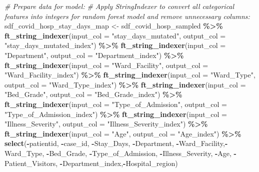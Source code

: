 \documentclass[
]{article}
\newenvironment{Shaded}{\begin{snugshade}}{\end{snugshade}}
\newcommand{\AttributeTok}[1]{\textcolor[rgb]{0.13,0.29,0.53}{#1}}
\newcommand{\CommentTok}[1]{\textcolor[rgb]{0.56,0.35,0.01}{\textit{#1}}}
\newcommand{\FunctionTok}[1]{\textcolor[rgb]{0.13,0.29,0.53}{\textbf{#1}}}
\newcommand{\NormalTok}[1]{#1}
\newcommand{\OtherTok}[1]{\textcolor[rgb]{0.56,0.35,0.01}{#1}}
\newcommand{\SpecialCharTok}[1]{\textcolor[rgb]{0.81,0.36,0.00}{\textbf{#1}}}
\newcommand{\StringTok}[1]{\textcolor[rgb]{0.31,0.60,0.02}{#1}}
\begin{document}
\begin{Shaded}
\begin{Highlighting}[]
\CommentTok{\# Prepare data for model: }
\CommentTok{\# Apply StringIndexer to convert all categorical features into integers for random forest model and remove unnecessary columns:}
\NormalTok{sdf\_covid\_hosp\_stay\_days\_map }\OtherTok{\textless{}{-}}\NormalTok{ sdf\_covid\_hosp\_sampled }\SpecialCharTok{\%\textgreater{}\%}
  \FunctionTok{ft\_string\_indexer}\NormalTok{(}\AttributeTok{input\_col =} \StringTok{"stay\_days\_mutated"}\NormalTok{, }\AttributeTok{output\_col =} \StringTok{"stay\_days\_mutated\_index"}\NormalTok{) }\SpecialCharTok{\%\textgreater{}\%}
  \FunctionTok{ft\_string\_indexer}\NormalTok{(}\AttributeTok{input\_col =} \StringTok{"Department"}\NormalTok{, }\AttributeTok{output\_col =} \StringTok{"Department\_index"}\NormalTok{) }\SpecialCharTok{\%\textgreater{}\%}
  \FunctionTok{ft\_string\_indexer}\NormalTok{(}\AttributeTok{input\_col =} \StringTok{"Ward\_Facility"}\NormalTok{, }\AttributeTok{output\_col =} \StringTok{"Ward\_Facility\_index"}\NormalTok{) }\SpecialCharTok{\%\textgreater{}\%}
  \FunctionTok{ft\_string\_indexer}\NormalTok{(}\AttributeTok{input\_col =} \StringTok{"Ward\_Type"}\NormalTok{, }\AttributeTok{output\_col =} \StringTok{"Ward\_Type\_index"}\NormalTok{) }\SpecialCharTok{\%\textgreater{}\%}
  \FunctionTok{ft\_string\_indexer}\NormalTok{(}\AttributeTok{input\_col =} \StringTok{"Bed\_Grade"}\NormalTok{, }\AttributeTok{output\_col =} \StringTok{"Bed\_Grade\_index"}\NormalTok{) }\SpecialCharTok{\%\textgreater{}\%}
  \FunctionTok{ft\_string\_indexer}\NormalTok{(}\AttributeTok{input\_col =} \StringTok{"Type\_of\_Admission"}\NormalTok{, }\AttributeTok{output\_col =} \StringTok{"Type\_of\_Admission\_index"}\NormalTok{) }\SpecialCharTok{\%\textgreater{}\%}
  \FunctionTok{ft\_string\_indexer}\NormalTok{(}\AttributeTok{input\_col =} \StringTok{"Illness\_Severity"}\NormalTok{, }\AttributeTok{output\_col =} \StringTok{"Illness\_Severity\_index"}\NormalTok{) }\SpecialCharTok{\%\textgreater{}\%} 
  \FunctionTok{ft\_string\_indexer}\NormalTok{(}\AttributeTok{input\_col =} \StringTok{"Age"}\NormalTok{, }\AttributeTok{output\_col =} \StringTok{"Age\_index"}\NormalTok{) }\SpecialCharTok{\%\textgreater{}\%} 
  \FunctionTok{select}\NormalTok{(}\SpecialCharTok{{-}}\NormalTok{patientid, }\SpecialCharTok{{-}}\NormalTok{case\_id, }\SpecialCharTok{{-}}\NormalTok{Stay\_Days, }\SpecialCharTok{{-}}\NormalTok{Department, }\SpecialCharTok{{-}}\NormalTok{Ward\_Facility,}\SpecialCharTok{{-}}\NormalTok{Ward\_Type, }\SpecialCharTok{{-}}\NormalTok{Bed\_Grade, }\SpecialCharTok{{-}}\NormalTok{Type\_of\_Admission, }\SpecialCharTok{{-}}\NormalTok{Illness\_Severity, }\SpecialCharTok{{-}}\NormalTok{Age, }\SpecialCharTok{{-}}\NormalTok{Patient\_Visitors, }\SpecialCharTok{{-}}\NormalTok{Department\_index,}\SpecialCharTok{{-}}\NormalTok{Hospital\_region) }

\end{Highlighting}
\end{Shaded}
\end{document}
